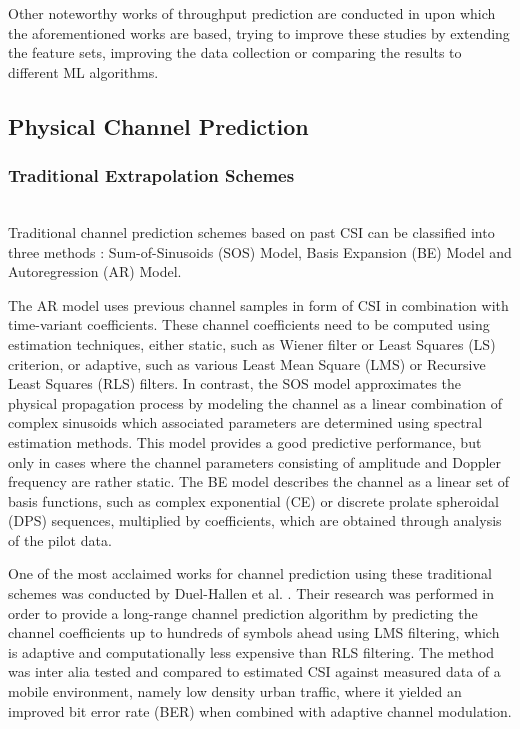\documentclass[conference]{IEEEtran}
\begin{document}
Other noteworthy works of throughput prediction are conducted in \cite{falkenbergDiscoverYourCompetition2017,yueLinkForecastCellularLink2018,sambaInstantaneousThroughputPrediction2017,sambaThroughputPredictionCellular2016} upon which the aforementioned works are based, trying to improve these studies by extending the feature sets, improving the data collection or comparing the results to different ML algorithms.


\subsection{Physical Channel Prediction}
\subsubsection{Traditional Extrapolation Schemes}\mbox{}\\
Traditional channel prediction schemes based on past CSI can be classified into three methods \cite{duel-hallenFadingChannelPrediction2007}: Sum-of-Sinusoids (SOS) Model, Basis Expansion (BE) Model and Autoregression (AR) Model.

The AR model uses previous channel samples in form of CSI in combination with time-variant coefficients. These channel coefficients need to be computed using estimation techniques, either static, such as Wiener filter or Least Squares (LS) criterion, or adaptive, such as various Least Mean Square (LMS) or Recursive Least Squares (RLS) filters. In contrast, the SOS model approximates the physical propagation process by modeling the channel as a linear combination of complex sinusoids which associated parameters are determined using spectral estimation methods. This model provides a good predictive performance, but only in cases where the channel parameters consisting of amplitude and Doppler frequency are rather static. The BE model describes the channel as a linear set of basis functions, such as complex exponential (CE) or discrete prolate spheroidal (DPS) sequences, multiplied by coefficients, which are obtained through analysis of the pilot data.

One of the most acclaimed works for channel prediction using these traditional schemes was conducted by Duel-Hallen et al. \cite{duel-hallenLongrangePredictionFading2000}. Their research was performed in order to provide a long-range channel prediction algorithm by predicting the channel coefficients up to hundreds of symbols ahead using LMS filtering, which is adaptive and computationally less expensive than RLS filtering. The method was inter alia tested and compared to estimated CSI against measured data of a mobile environment, namely low density urban traffic, where it yielded an improved bit error rate (BER) when combined with adaptive channel modulation.
\end{document}
